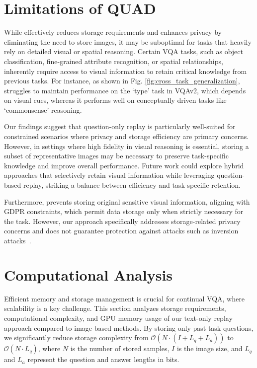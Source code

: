 \section{Limitations of QUAD} 
\label{sec.limitations}
While \qstmethodshort{} effectively reduces storage requirements and enhances privacy by eliminating the need to store images, it may be suboptimal for tasks that heavily rely on detailed visual or spatial reasoning. Certain VQA tasks, such as object classification, fine-grained attribute recognition, or spatial relationships, inherently require access to visual information to retain critical knowledge from previous tasks. For instance, as shown in Fig. \ref{fig:cross_task_generalization}, \qstmethodshort{} struggles to maintain performance on the `type' task in VQAv2, which depends on visual cues, whereas it performs well on conceptually driven tasks like `commonsense' reasoning.  

Our findings suggest that question-only replay is particularly well-suited for constrained scenarios where privacy and storage efficiency are primary concerns. However, in settings where high fidelity in visual reasoning is essential, storing a subset of representative images may be necessary to preserve task-specific knowledge and improve overall performance. Future work could explore hybrid approaches that selectively retain visual information while leveraging question-based replay, striking a balance between efficiency and task-specific retention.

Furthermore, \qstmethodshort{} prevents storing original sensitive visual information, aligning with GDPR constraints, which permit data storage only when strictly necessary for the task. However, our approach specifically addresses storage-related privacy concerns and does not guarantee protection against attacks such as inversion attacks~\cite{dibbo2023sok, zhang2020privacy}.


\section{Computational Analysis}
\label{sec.computational}
Efficient memory and storage management is crucial for continual VQA, where scalability is a key challenge. This section analyzes storage requirements, computational complexity, and GPU memory usage of our text-only replay approach compared to image-based methods. By storing only past task questions, we significantly reduce storage complexity from $\mathcal{O}(N\cdot (I + L_q+L_a))$ to $\mathcal{O}(N\cdot L_q)$, where $N$ is the number of stored samples, $I$ is the image size, and $L_q$ and $L_a$ represent the question and answer lengths in bits. %

